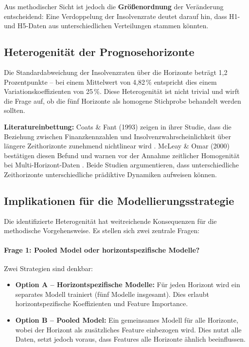 Aus methodischer Sicht ist jedoch die \textbf{Größenordnung} der Veränderung entscheidend: Eine Verdoppelung der Insolvenzrate deutet darauf hin, dass H1- und H5-Daten aus unterschiedlichen Verteilungen stammen könnten.

\subsection{Heterogenität der Prognosehorizonte}

Die Standardabweichung der Insolvenzraten über die Horizonte beträgt 1,2 Prozentpunkte – bei einem Mittelwert von 4,82\,\% entspricht dies einem Variationskoeffizienten von 25\,\%. Diese Heterogenität ist nicht trivial und wirft die Frage auf, ob die fünf Horizonte als homogene Stichprobe behandelt werden sollten.

\textbf{Literatureinbettung:} Coats \& Fant (1993) zeigen in ihrer Studie, dass die Beziehung zwischen Finanzkennzahlen und Insolvenzwahrscheinlichkeit über längere Zeithorizonte zunehmend nichtlinear wird \parencite{coats1993recognizing}. McLeay \& Omar (2000) bestätigen diesen Befund und warnen vor der Annahme zeitlicher Homogenität bei Multi-Horizont-Daten \parencite{mcleay2000prediction}. Beide Studien argumentieren, dass unterschiedliche Zeithorizonte unterschiedliche prädiktive Dynamiken aufweisen können.

\subsection{Implikationen für die Modellierungsstrategie}

Die identifizierte Heterogenität hat weitreichende Konsequenzen für die methodische Vorgehensweise. Es stellen sich zwei zentrale Fragen:

\paragraph{Frage 1: Pooled Model oder horizontspezifische Modelle?}

Zwei Strategien sind denkbar:

\begin{itemize}[topsep=0.2\baselineskip]
    \item \textbf{Option A – Horizontspezifische Modelle:} Für jeden Horizont wird ein separates Modell trainiert (fünf Modelle insgesamt). Dies erlaubt horizontspezifische Koeffizienten und Feature Importance.
    
    \item \textbf{Option B – Pooled Model:} Ein gemeinsames Modell für alle Horizonte, wobei der Horizont als zusätzliches Feature einbezogen wird. Dies nutzt alle Daten, setzt jedoch voraus, dass Features alle Horizonte ähnlich beeinflussen.
\end{itemize}

